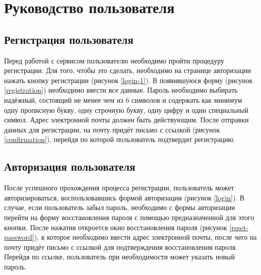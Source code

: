 \section{Руководство пользователя}
\subsection{Регистрация пользователя}
Перед работой с сервисом пользователю необходимо пройти процедуру регистрации. Для того, чтобы это сделать, необходимо на странице авторизации нажать кнопку регистрации (рисунок \ref{login-1}).
В появившуюся форму (рисунок \ref{registration}) необходимо ввести все данные. Пароль необходимо выбирать надёжный, состоящий не менее чем из 6 символов и содержать как минимум одну прописную букву, одну строчную букву, одну цифру и один специальный символ.
Адрес электронной почты должен быть действующим.
После отправки данных для регистрации, на почту придёт письмо с ссылкой (рисунок \ref{confirmation}), перейдя по которой пользователь подтвердит регистрацию.
\subsection{Авторизация пользователя}
После успешного прохождения процесса регистрации, пользователь может авторизироваться, воспользовавшись формой авторизации (рисунок \ref{login}).
В случае, если пользователь забыл пароль, необходимо с формы авторизации перейти на форму восстановления пароля с помощью предназначенной для этого кнопки.
После нажатия откроется окно восстановления пароля (рисунок \ref{reset-password}), в которое необходимо ввести адрес электронной почты, после чего на почту придёт письмо с ссылкой для подтверждения восстановления пароля.
Перейдя по ссылке, пользователь при необходимости может указать новый пароль.

